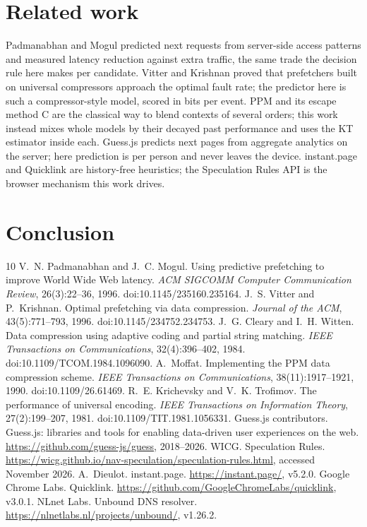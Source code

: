 \documentclass[11pt]{article}
\begin{document}
\section{Related work}
Padmanabhan and Mogul \cite{padmanabhan1996} predicted next requests from server-side access patterns and measured latency reduction against extra traffic, the same trade the decision rule here makes per candidate. Vitter and Krishnan \cite{vitter1996} proved that prefetchers built on universal compressors approach the optimal fault rate; the predictor here is such a compressor-style model, scored in bits per event. PPM \cite{cleary1984} and its escape method C \cite{moffat1990} are the classical way to blend contexts of several orders; this work instead mixes whole models by their decayed past performance and uses the KT estimator \cite{kt1981} inside each. Guess.js \cite{guessjs} predicts next pages from aggregate analytics on the server; here prediction is per person and never leaves the device. instant.page \cite{instantpage} and Quicklink \cite{quicklink} are history-free heuristics; the Speculation Rules API \cite{specrules} is the browser mechanism this work drives.

\section{Conclusion}


\begin{thebibliography}{10}\small
{} V.~N. Padmanabhan and J.~C. Mogul. Using predictive prefetching to improve World Wide Web latency. \emph{ACM SIGCOMM Computer Communication Review}, 26(3):22--36, 1996. doi:10.1145/235160.235164.
 J.~S. Vitter and P.~Krishnan. Optimal prefetching via data compression. \emph{Journal of the ACM}, 43(5):771--793, 1996. doi:10.1145/234752.234753.
 J.~G. Cleary and I.~H. Witten. Data compression using adaptive coding and partial string matching. \emph{IEEE Transactions on Communications}, 32(4):396--402, 1984. doi:10.1109/TCOM.1984.1096090.
 A.~Moffat. Implementing the PPM data compression scheme. \emph{IEEE Transactions on Communications}, 38(11):1917--1921, 1990. doi:10.1109/26.61469.
 R.~E. Krichevsky and V.~K. Trofimov. The performance of universal encoding. \emph{IEEE Transactions on Information Theory}, 27(2):199--207, 1981. doi:10.1109/TIT.1981.1056331.
 Guess.js contributors. Guess.js: libraries and tools for enabling data-driven user experiences on the web. \url{https://github.com/guess-js/guess}, 2018--2026.
 WICG. Speculation Rules. \url{https://wicg.github.io/nav-speculation/speculation-rules.html}, accessed November 2026.
 A.~Dieulot. instant.page. \url{https://instant.page/}, v5.2.0.
 Google Chrome Labs. Quicklink. \url{https://github.com/GoogleChromeLabs/quicklink}, v3.0.1.
 NLnet Labs. Unbound DNS resolver. \url{https://nlnetlabs.nl/projects/unbound/}, v1.26.2.
\end{thebibliography}
\end{document}
